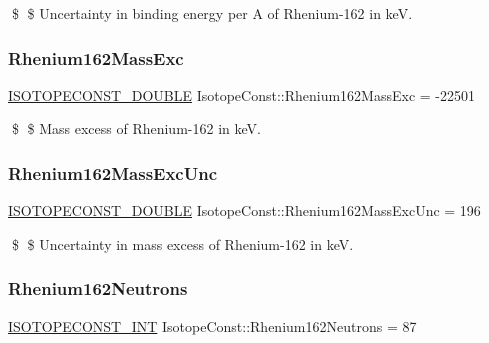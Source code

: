 \$ \$ Uncertainty in binding energy per A of Rhenium-\/162 in keV. \mbox{\label{group___isotope_const-_rhenium-_re162_ga2f20c5b68d2ac59688597f628072d218}} 
\subsubsection{\texorpdfstring{Rhenium162\+Mass\+Exc}{Rhenium162MassExc}}
{\footnotesize\ttfamily \mbox{\hyperlink{group___isotope_const-_macros_ga8f45a7272ce02c0b4c65c44636ed719a}{I\+S\+O\+T\+O\+P\+E\+C\+O\+N\+S\+T\+\_\+\+D\+O\+U\+B\+LE}} Isotope\+Const\+::\+Rhenium162\+Mass\+Exc = -\/22501}

\$ \$ Mass excess of Rhenium-\/162 in keV. \mbox{\label{group___isotope_const-_rhenium-_re162_gad6bc42e6309a7b00c898be8ee064d8b9}} 
\subsubsection{\texorpdfstring{Rhenium162\+Mass\+Exc\+Unc}{Rhenium162MassExcUnc}}
{\footnotesize\ttfamily \mbox{\hyperlink{group___isotope_const-_macros_ga8f45a7272ce02c0b4c65c44636ed719a}{I\+S\+O\+T\+O\+P\+E\+C\+O\+N\+S\+T\+\_\+\+D\+O\+U\+B\+LE}} Isotope\+Const\+::\+Rhenium162\+Mass\+Exc\+Unc = 196}

\$ \$ Uncertainty in mass excess of Rhenium-\/162 in keV. \mbox{\label{group___isotope_const-_rhenium-_re162_ga3f65bbc90165e6b6bd7e57488c8c3eca}} 
\subsubsection{\texorpdfstring{Rhenium162\+Neutrons}{Rhenium162Neutrons}}
{\footnotesize\ttfamily \mbox{\hyperlink{group___isotope_const-_macros_ga5f18360b3e99483a35c32d789e62621c}{I\+S\+O\+T\+O\+P\+E\+C\+O\+N\+S\+T\+\_\+\+I\+NT}} Isotope\+Const\+::\+Rhenium162\+Neutrons = 87}

